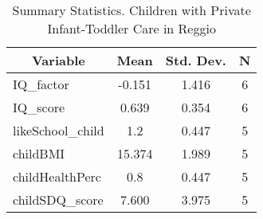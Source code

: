 
\begin{table}[htbp]\centering \caption{Summary Statistics. Children with Private Infant-Toddler Care in Reggio \label{bothChildasiloPrivReggio}}
\begin{tabular}{l c c  c}\hline\hline
\multicolumn{1}{c}{\textbf{Variable}} & \textbf{Mean}
 & \textbf{Std. Dev.} & \textbf{N}\\ \hline
IQ\_factor & -0.151 & 1.416  & 6\\
IQ\_score & 0.639 & 0.354  & 6\\
likeSchool\_child & 1.2 & 0.447  & 5\\
childBMI & 15.374 & 1.989  & 5\\
childHealthPerc & 0.8 & 0.447  & 5\\
childSDQ\_score & 7.600 & 3.975  & 5\\
\hline\end{tabular}
\end{table}
